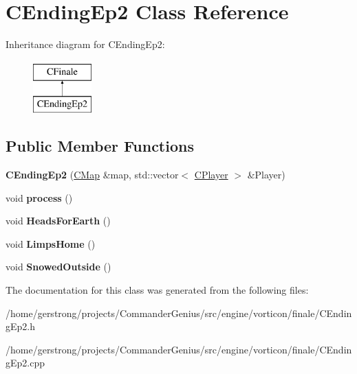 \hypertarget{class_c_ending_ep2}{
\section{CEndingEp2 Class Reference}
\label{class_c_ending_ep2}
}
Inheritance diagram for CEndingEp2:\begin{figure}[H]
\begin{center}
\leavevmode
\includegraphics[height=2cm]{class_c_ending_ep2}
\end{center}
\end{figure}
\subsection*{Public Member Functions}
\begin{DoxyCompactItemize}
\item 
\hypertarget{class_c_ending_ep2_a2d827c0fe5778132e09d2b5ba948a9b7}{
{\bfseries CEndingEp2} (\hyperlink{class_c_map}{CMap} \&map, std::vector$<$ \hyperlink{class_c_player}{CPlayer} $>$ \&Player)}
\label{class_c_ending_ep2_a2d827c0fe5778132e09d2b5ba948a9b7}

\item 
\hypertarget{class_c_ending_ep2_a18c5e7adb027fd8f1db056631b1de408}{
void {\bfseries process} ()}
\label{class_c_ending_ep2_a18c5e7adb027fd8f1db056631b1de408}

\item 
\hypertarget{class_c_ending_ep2_a65f3a442c7c269dd5a45d16ddff017d5}{
void {\bfseries HeadsForEarth} ()}
\label{class_c_ending_ep2_a65f3a442c7c269dd5a45d16ddff017d5}

\item 
\hypertarget{class_c_ending_ep2_a7639769b858cb9a6743b92fa22b0791b}{
void {\bfseries LimpsHome} ()}
\label{class_c_ending_ep2_a7639769b858cb9a6743b92fa22b0791b}

\item 
\hypertarget{class_c_ending_ep2_a8b6bf2c7cb3c8889a542efad390ac1c1}{
void {\bfseries SnowedOutside} ()}
\label{class_c_ending_ep2_a8b6bf2c7cb3c8889a542efad390ac1c1}

\end{DoxyCompactItemize}


The documentation for this class was generated from the following files:\begin{DoxyCompactItemize}
\item 
/home/gerstrong/projects/CommanderGenius/src/engine/vorticon/finale/CEndingEp2.h\item 
/home/gerstrong/projects/CommanderGenius/src/engine/vorticon/finale/CEndingEp2.cpp\end{DoxyCompactItemize}
